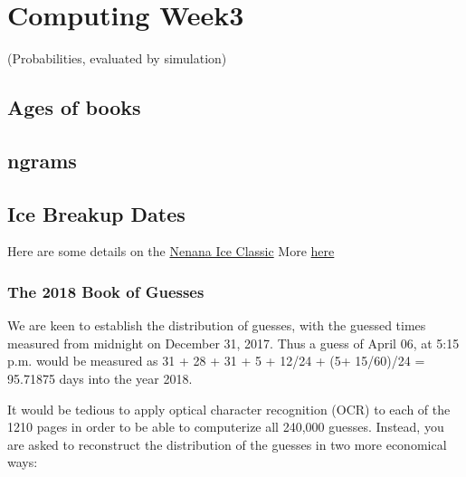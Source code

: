 \documentclass[]{book}
\begin{document}
\hypertarget{computing03}{%
\chapter{Computing Week3}\label{computing03}}

(Probabilities, evaluated by simulation)

\hypertarget{ages-of-books}{%
\section{Ages of books}\label{ages-of-books}}

\hypertarget{ngrams}{%
\section{ngrams}\label{ngrams}}

\hypertarget{ice-breakup-dates}{%
\section{Ice Breakup Dates}\label{ice-breakup-dates}}

Here are some details on the
\href{http://www.nenanaakiceclassic.com}{Nenana Ice Classic}
More \href{http://www.john-daly.com/nenana.htm}{here}

\hypertarget{the-2018-book-of-guesses}{%
\subsection{The 2018 Book of Guesses}\label{the-2018-book-of-guesses}}

We are keen to establish the distribution of guesses, with the guessed times measured from midnight on December 31, 2017. Thus a guess of April 06, at 5:15 p.m. would be measured as 31 + 28 + 31 + 5 + 12/24 + (5+ 15/60)/24 = 95.71875 days into the year 2018.

It would be tedious to apply optical character recognition (OCR) to each of the 1210 pages in order to be able to computerize all 240,000 guesses. Instead, you are asked to reconstruct the distribution of the guesses in two more economical ways:
\end{document}
